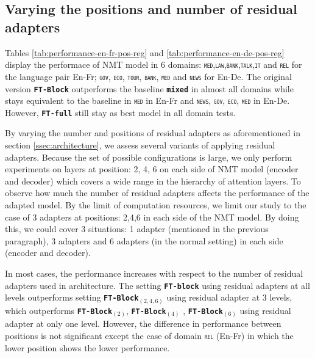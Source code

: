 \documentclass[11pt,a4paper]{article}
\newcommand{\fyTodo}[1]{\Todo[FY:]{\textcolor{orange}{#1}}}
\newcommand{\domain}[1]{\texttt{\textsc{#1}}}
\newcommand{\system}[1]{\texttt{\textbf{#1}}}
\begin{document}
\subsection{Varying the positions and number of residual adapters}
Tables \ref{tab:performance-en-fr-pos-reg} and \ref{tab:performance-en-de-pos-reg} display the performace of NMT model in 6 domains: \domain{med},\domain{law},\domain{bank},\domain{talk},\domain{it} and \domain{rel} for the language pair En-Fr; \domain{gov}, \domain{eco}, \domain{tour}, \domain{bank}, \domain{med} and \domain{news} for En-De. The original version \system{FT-Block} outperforms the baseline \system{mixed} in almost all domains while stays equivalent to the baseline in \domain{med} in En-Fr and \domain{news}, \domain{gov}, \domain{eco}, \domain{med} in En-De. However, \system{FT-full} still stay as best model in all domain tests.

By varying the number and positions of residual adapters as aforementioned in section \ref{ssec:architecture}, we assess several variants of applying residual adapters. \fyTodo{Fix style here} Because the set of possible configurations is large, we only perform experiments on layers at position: 2, 4, 6 on each side of NMT model (encoder and decoder) which covers a wide range in the hierarchy of attention layers. To observe how much the number of residual adapters affects the performance of the adapted model. By the limit of computation resources, we limit our study to the case of 3 adapters at positions: 2,4,6 in each side of the NMT model. By doing this, we could cover 3 situations: 1 adapter (mentioned in the previous paragraph), 3 adapters and 6 adapters (in the normal setting) in each side (encoder and decoder).\fyTodo{We have 12 layers, have we not ?}

 In most cases, the performance increases with respect to the number of residual adapters used in architecture. The setting \system{FT-block} using residual adapters at all levels outperforms setting \system{FT-Block$_{(2,4,6)}$} using residual adapter at 3 levels, which outperforms \system{FT-Block$_{(2)}$}, \system{FT-Block$_{(4)}$} , \system{FT-Block$_{(6)}$} using residual adapter at only one level. However, the difference in performance between positions is not significant except the case of domain \domain{rel} (En-Fr) in which the lower position shows the lower performance.\fyTodo{What does bold mean ?}\fyTodo{Number of parameters ?} 
\end{document}
